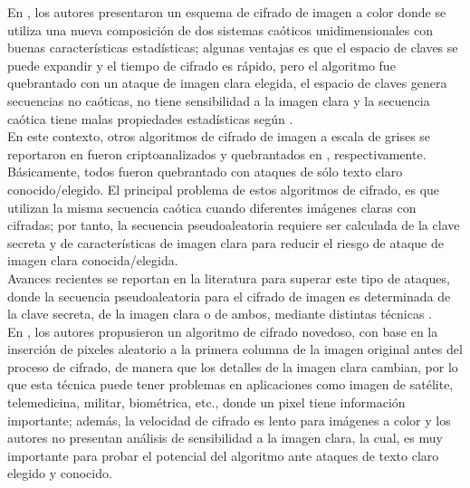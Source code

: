 En \cite{TyC_2008}, los autores presentaron un esquema de cifrado de imagen a color donde se utiliza una nueva composición de dos sistemas caóticos unidimensionales con buenas características estadísticas; algunas ventajas es que el espacio de claves se puede expandir y el tiempo de cifrado es rápido, pero el algoritmo fue quebrantado con un ataque de imagen clara elegida, el espacio de claves genera secuencias no caóticas, no tiene sensibilidad a la imagen clara y la secuencia caótica tiene malas propiedades estadísticas según \cite{LEtAl_2009}. \\

En este contexto, otros algoritmos de cifrado de imagen a escala de grises se reportaron en \cite{F_1998, CEtAl_2004, WEtAl_2010, FEtAl_2006, GEtAl_2006, XEtAl_2006, GEtAl_2005} fueron criptoanalizados y quebrantados en \cite{WEtAl_2005, WEtAl_2007, ByN_2008, CyS_2009, AyL_2009, SEtAl_2010, ZEtAl_2012}, respectivamente. Básicamente, todos fueron quebrantado con ataques de sólo texto claro conocido/elegido. El principal problema de estos algoritmos de cifrado, es que utilizan la misma secuencia caótica cuando diferentes imágenes claras con cifradas; por tanto, la secuencia pseudoaleatoria requiere ser calculada de la clave secreta y de características de imagen clara para reducir el riesgo de ataque de imagen clara conocida/elegida. \\

Avances recientes se reportan en la literatura para superar este tipo de ataques, donde la secuencia pseudoaleatoria para el cifrado de imagen es determinada de la clave secreta, de la imagen clara o de ambos, mediante distintas técnicas \cite{ZEtAl_2013, ByE_2013, FEtAl_2013a, Z_2012, WyY_2009, ZEtAl_2014}. \\           

En \cite{ZEtAl_2014}, los autores propusieron un algoritmo de cifrado novedoso, con base en la inserción de pixeles aleatorio a la primera columna de la imagen original antes del proceso de cifrado, de manera que los detalles de la imagen clara cambian, por lo que esta técnica puede tener problemas en aplicaciones como imagen de satélite, telemedicina, militar, biométrica, etc., donde un pixel tiene información importante; además, la velocidad de cifrado es lento para imágenes a color y los autores no presentan análisis de sensibilidad a la imagen clara, la cual, es muy importante para probar el potencial del algoritmo ante ataques de texto claro elegido y conocido. \\

